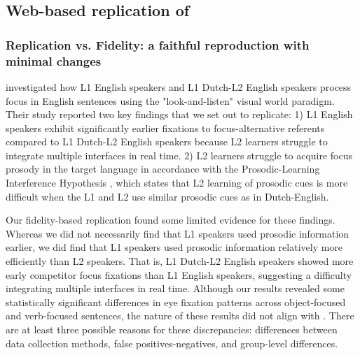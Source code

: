
\subsection{Web-based replication of \cite{Ge2021}}

\subsubsection{Replication vs. Fidelity: a faithful reproduction with minimal changes}

\cite{Ge2021} investigated how L1 English speakers and L1 Dutch-L2 English speakers process focus in English sentences using the "look-and-listen" visual world paradigm. Their study reported two key findings that we set out to replicate: 1) L1 English speakers exhibit significantly earlier fixations to focus-alternative referents compared to L1 Dutch-L2 English speakers because L2 learners struggle to integrate multiple interfaces in real time. 2) L2 learners struggle to acquire focus prosody in the target language in accordance with the Prosodic-Learning Interference Hypothesis \citep{tremblay2016effects, tremblay2021re}, which states that L2 learning of prosodic cues is more difficult when the L1 and L2 use similar prosodic cues as in Dutch-English.

Our fidelity-based replication found some limited evidence for these findings. Whereas we did not necessarily find that L1 speakers used prosodic information earlier, we did find that L1 speakers used prosodic information relatively more efficiently than L2 speakers. That is, L1 Dutch-L2 English speakers showed more early competitor focus fixations than L1 English speakers, suggesting a difficulty integrating multiple interfaces in real time. Although our results revealed some statistically significant differences in eye fixation patterns across object-focused and verb-focused sentences, the nature of these results did not align with \cite{Ge2021}. There are at least three possible reasons for these discrepancies: differences between data collection methods, false positives-negatives, and group-level differences. 


